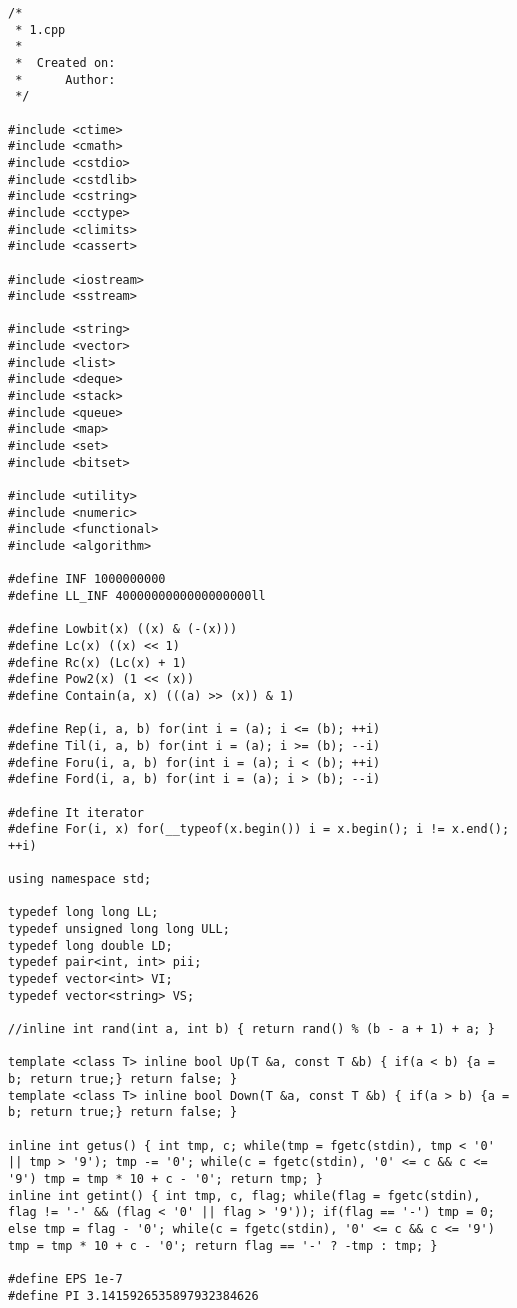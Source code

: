 \begin{lstlisting}
﻿/*
 * 1.cpp
 *
 *  Created on:
 *      Author:
 */

#include <ctime>
#include <cmath>
#include <cstdio>
#include <cstdlib>
#include <cstring>
#include <cctype>
#include <climits>
#include <cassert>

#include <iostream>
#include <sstream>

#include <string>
#include <vector>
#include <list>
#include <deque>
#include <stack>
#include <queue>
#include <map>
#include <set>
#include <bitset>

#include <utility>
#include <numeric>
#include <functional>
#include <algorithm>

#define INF 1000000000
#define LL_INF 4000000000000000000ll

#define Lowbit(x) ((x) & (-(x)))
#define Lc(x) ((x) << 1)
#define Rc(x) (Lc(x) + 1)
#define Pow2(x) (1 << (x))
#define Contain(a, x) (((a) >> (x)) & 1)

#define Rep(i, a, b) for(int i = (a); i <= (b); ++i)
#define Til(i, a, b) for(int i = (a); i >= (b); --i)
#define Foru(i, a, b) for(int i = (a); i < (b); ++i)
#define Ford(i, a, b) for(int i = (a); i > (b); --i)

#define It iterator
#define For(i, x) for(__typeof(x.begin()) i = x.begin(); i != x.end(); ++i)

using namespace std;

typedef long long LL;
typedef unsigned long long ULL;
typedef long double LD;
typedef pair<int, int> pii;
typedef vector<int> VI;
typedef vector<string> VS;

//inline int rand(int a, int b) { return rand() % (b - a + 1) + a; }

template <class T> inline bool Up(T &a, const T &b) { if(a < b) {a = b; return true;} return false; }
template <class T> inline bool Down(T &a, const T &b) { if(a > b) {a = b; return true;} return false; }

inline int getus() { int tmp, c; while(tmp = fgetc(stdin), tmp < '0' || tmp > '9'); tmp -= '0'; while(c = fgetc(stdin), '0' <= c && c <= '9') tmp = tmp * 10 + c - '0'; return tmp; }
inline int getint() { int tmp, c, flag; while(flag = fgetc(stdin), flag != '-' && (flag < '0' || flag > '9')); if(flag == '-') tmp = 0; else tmp = flag - '0'; while(c = fgetc(stdin), '0' <= c && c <= '9') tmp = tmp * 10 + c - '0'; return flag == '-' ? -tmp : tmp; }

#define EPS 1e-7
#define PI 3.1415926535897932384626


\end{lstlisting}
